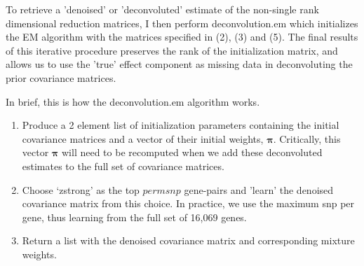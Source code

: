 \documentclass[10pt]{article}
\begin{document}
\begin{itemize}


To retrieve a 'denoised' or 'deconvoluted' estimate of the non-single rank dimensional reduction matrices, I then perform deconvolution.em which initializes the EM algorithm with  the matrices specified in (2), (3) and (5). The final results of this iterative procedure preserves the rank of the initialization matrix, and allows us to use the 'true' effect component as missing data in deconvoluting the prior covariance matrices.

In brief, this is how the deconvolution.em algorithm works.

\begin{enumerate}
\item Produce a 2 element list of initialization parameters containing the initial covariance matrices and a vector of their initial weights, $\mathbf{\pi}$. Critically, this vector $\mathbf{\pi}$ will need to be recomputed when we add these deconvoluted estimates to the full set of covariance matrices.

\item Choose `zstrong' as the top $permsnp$ gene-pairs  and 'learn' the denoised covariance matrix from this choice. In practice, we use the maximum snp per gene, thus learning from the full set of 16,069 genes.
\item Return a list with the denoised covariance matrix and corresponding mixture weights.
\end {enumerate}


\end{itemize}
\end{document}
